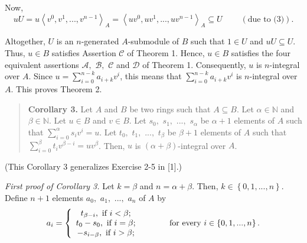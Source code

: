 \documentclass[12pt,final,notitlepage,onecolumn]{article}%
\begin{document}
Now,%
\[
uU=u\left\langle v^{0},v^{1},...,v^{n-1}\right\rangle _{A}=\left\langle
uv^{0},uv^{1},...,uv^{n-1}\right\rangle _{A}\subseteq
U\ \ \ \ \ \ \ \ \ \ \left(  \text{due to (3)}\right)  .
\]


Altogether, $U$ is an $n$-generated $A$-submodule of $B$ such that $1\in U$
and $uU\subseteq U$. Thus, $u\in B$ satisfies Assertion $\mathcal{C}$ of
Theorem 1. Hence, $u\in B$ satisfies the four equivalent assertions
$\mathcal{A},$ $\mathcal{B},$ $\mathcal{C}$ and $\mathcal{D}$ of Theorem 1.
Consequently, $u$ is $n$-integral over $A$. Since $u=\sum\limits_{i=0}%
^{n-k}a_{i+k}v^{i}$, this means that $\sum\limits_{i=0}^{n-k}a_{i+k}v^{i}$ is
$n$-integral over $A$. This proves Theorem 2.

\begin{quote}
\textbf{Corollary 3.} Let $A$ and $B$ be two rings such that $A\subseteq B$.
Let $\alpha\in\mathbb{N}$ and $\beta\in\mathbb{N}$. Let $u\in B$ and $v\in B$.
Let $s_{0},$ $s_{1},$ $...,$ $s_{\alpha}$ be $\alpha+1$ elements of $A$ such
that $\sum\limits_{i=0}^{\alpha}s_{i}v^{i}=u$. Let $t_{0},$ $t_{1},$ $...,$
$t_{\beta}$ be $\beta+1$ elements of $A$ such that $\sum\limits_{i=0}^{\beta
}t_{i}v^{\beta-i}=uv^{\beta}$. Then, $u$ is $\left(  \alpha+\beta\right)
$-integral over $A$.
\end{quote}

(This Corollary 3 generalizes Exercise 2-5 in [1].)

\textit{First proof of Corollary 3.} Let $k=\beta$ and $n=\alpha+\beta$. Then,
$k\in\left\{  0,1,...,n\right\}  $. Define $n+1$ elements $a_{0},$ $a_{1},$
$...,$ $a_{n}$ of $A$ by%
\[
a_{i}=\left\{
\begin{array}
[c]{c}%
t_{\beta-i},\text{ if }i<\beta;\\
t_{0}-s_{0},\text{ if }i=\beta;\\
-s_{i-\beta},\text{ if }i>\beta;
\end{array}
\right.  \ \ \ \ \ \ \ \ \ \ \text{for every }i\in\left\{  0,1,...,n\right\}
.
\]
\end{document}
